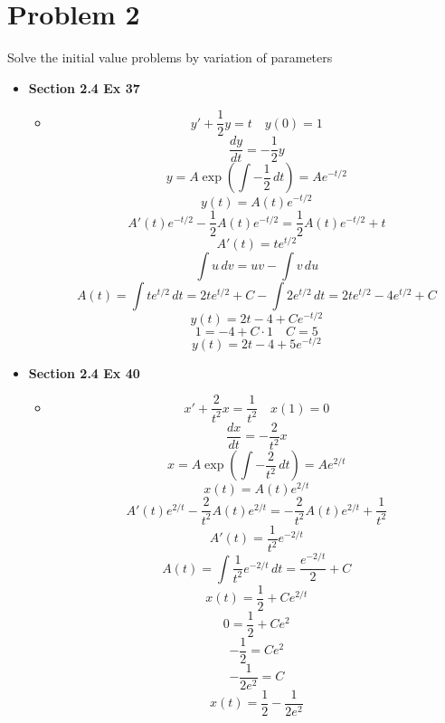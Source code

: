 \documentclass[hidelinks]{article}
\begin{document}
\section*{Problem 2}
Solve the initial value problems by variation of parameters
\begin{itemize}
    \item[ ] \textbf{Section 2.4 Ex 37} 
    \begin{itemize}
        \item[ ] 
        \[
            y' + \frac{1}{2} y = t \quad y(0) = 1
        \]
        \[
            \frac{dy}{dt} = -\frac{1}{2} y
        \]
        \[
            y = A\exp(\int -\frac{1}{2} \, dt) = Ae^{-t/2}
        \]
        \[
            y(t) = A(t)e^{-t/2}
        \]
        \[
            A'(t)e^{-t/2} - \frac{1}{2}A(t)e^{-t/2} =\frac{1}{2}A(t)e^{-t/2} + t
        \]
        \[
            A'(t) = te^{t/2}
        \]
        \[
            \int u \, dv = uv - \int v \, du 
        \]
        \[
            A(t) = \int te^{t/2} \, dt =  2te^{t/2} + C - \int 2e^{t/2} \, dt 
            = 2te^{t/2} - 4e^{t/2} + C
        \]
        \[
            y(t) = 2t - 4 + Ce^{-t/2}
        \]
        \[
            1 = -4 + C \cdot 1
            \quad C = 5
        \]
        \[
            y(t) = 2t - 4 + 5e^{-t/2} 
        \]
    \end{itemize}
    \item[ ] \textbf{Section 2.4 Ex 40} 
    \begin{itemize}
        \item[ ] 
        \[
            x' + \frac{2}{t^2} x = \frac{1}{t^2} \quad x(1) = 0 
        \]
        \[
            \frac{dx}{dt} = -\frac{2}{t^2} x 
        \]
        \[
            x = A\exp(\int -\frac{2}{t^2} \, dt) = Ae^{2/t}  
        \]
        \[
            x(t) = A(t)e^{2/t}
        \]
        \[
            A'(t)e^{2/t} - \frac{2}{t^2}A(t) e^{2/t} = 
            -\frac{2}{t^2}A(t) e^{2/t} + \frac{1}{t^2}
        \]
        \[
            A'(t) = \frac{1}{t^2} e^{-2/t}
        \]
        \[
            A(t) = \int\frac{1}{t^2} e^{-2/t} \, dt
                 = \frac{e^{-2/t}}{2} + C
        \]
        \[
            x(t) = \frac{1}{2} + Ce^{2/t}
        \]
        \[
            0 = \frac{1}{2} + Ce^{2}
        \]
        \[
            -\frac{1}{2} = Ce^{2}
        \]
        \[
            -\frac{1}{2e^2} = C
        \]
        \[
            x(t) = \frac{1}{2} - \frac{1}{2e^2}
        \]
    \end{itemize}
\end{itemize}
\newpage
\end{document}
